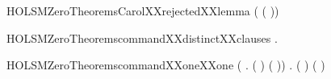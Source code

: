 \begin{SaveVerbatim}{HOLSMZeroTheoremsCarolXXrejectedXXlemma}
\HOLTokenTurnstile{} \HOLSymConst{\HOLTokenNeg{}} (    ( ))
\end{SaveVerbatim}
\newcommand{\HOLSMZeroTheoremsCarolXXrejectedXXlemma}{\UseVerbatim{HOLSMZeroTheoremsCarolXXrejectedXXlemma}}
\begin{SaveVerbatim}{HOLSMZeroTheoremscommandXXdistinctXXclauses}
\HOLTokenTurnstile{} \HOLSymConst{\HOLTokenForall{}} .   \HOLSymConst{\HOLTokenNotEqual{}}  
\end{SaveVerbatim}
\newcommand{\HOLSMZeroTheoremscommandXXdistinctXXclauses}{\UseVerbatim{HOLSMZeroTheoremscommandXXdistinctXXclauses}}
\begin{SaveVerbatim}{HOLSMZeroTheoremscommandXXoneXXone}
\HOLTokenTurnstile{} (\HOLSymConst{\HOLTokenForall{}} . (  \HOLSymConst{=}  ) \HOLSymConst{\HOLTokenEquiv{}} ( \HOLSymConst{=} )) \HOLSymConst{\HOLTokenConj{}}
   \HOLSymConst{\HOLTokenForall{}} . (  \HOLSymConst{=}  ) \HOLSymConst{\HOLTokenEquiv{}} ( \HOLSymConst{=} )
\end{SaveVerbatim}
\newcommand{\HOLSMZeroTheoremscommandXXoneXXone}{\UseVerbatim{HOLSMZeroTheoremscommandXXoneXXone}}
